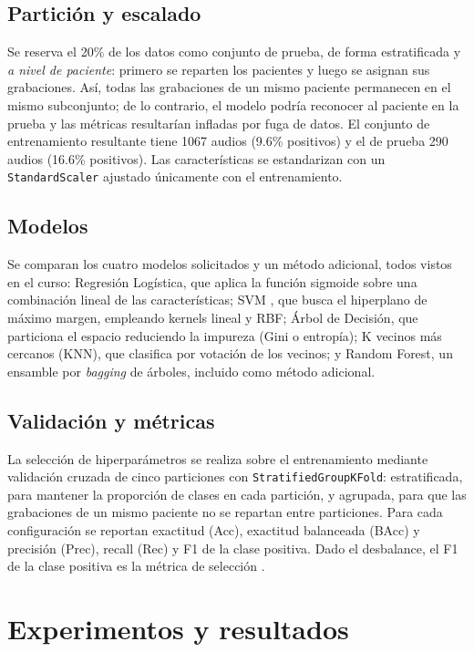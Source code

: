 \documentclass[conference]{IEEEtran}
\begin{document}
\subsection{Partici\'on y escalado}
\label{sec:val}
Se reserva el 20\% de los datos como conjunto de prueba, de forma estratificada y \emph{a nivel de paciente}: primero se reparten los pacientes y luego se asignan sus grabaciones. As\'i, todas las grabaciones de un mismo paciente permanecen en el mismo subconjunto; de lo contrario, el modelo podr\'ia reconocer al paciente en la prueba y las m\'etricas resultar\'ian infladas por fuga de datos. El conjunto de entrenamiento resultante tiene 1067 audios (9.6\% positivos) y el de prueba 290 audios (16.6\% positivos). Las caracter\'isticas se estandarizan con un \texttt{StandardScaler} ajustado \'unicamente con el entrenamiento.

\subsection{Modelos}
Se comparan los cuatro modelos solicitados y un m\'etodo adicional, todos vistos en el curso:
Regresi\'on Log\'istica, que aplica la funci\'on sigmoide sobre una combinaci\'on lineal de las caracter\'isticas;
SVM \cite{svm}, que busca el hiperplano de m\'aximo margen, empleando kernels lineal y RBF;
\'Arbol de Decisi\'on, que particiona el espacio reduciendo la impureza (Gini o entrop\'ia);
K vecinos m\'as cercanos (KNN), que clasifica por votaci\'on de los vecinos;
y Random Forest, un ensamble por \emph{bagging} de \'arboles, incluido como m\'etodo adicional.

\subsection{Validaci\'on y m\'etricas}
La selecci\'on de hiperpar\'ametros se realiza sobre el entrenamiento mediante validaci\'on cruzada de cinco particiones con \texttt{StratifiedGroupKFold}: estratificada, para mantener la proporci\'on de clases en cada partici\'on, y agrupada, para que las grabaciones de un mismo paciente no se repartan entre particiones. Para cada configuraci\'on se reportan exactitud (Acc), exactitud balanceada (BAcc) y precisi\'on (Prec), recall (Rec) y F1 de la clase positiva. Dado el desbalance, el F1 de la clase positiva es la m\'etrica de selecci\'on \cite{scikit}.

\section{Experimentos y resultados}
\end{document}
